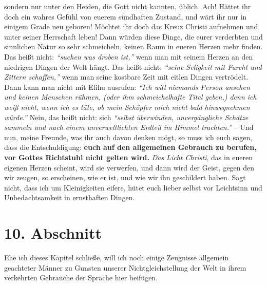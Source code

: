 sondern nur unter den Heiden, die
Gott nicht kannten, üblich. Ach! Hättet ihr doch ein wahres Gefühl von euerem
sündhaften Zustand, und wärt ihr nur in einigem
Grade neu geboren! Möchtet ihr
doch das Kreuz Christi aufnehmen und unter seiner
Herrschaft leben! Dann würden
diese Dinge, die eurer verderbten und sinnlichen
Natur so sehr schmeicheln,
keinen Raum in eueren Herzen mehr finden. Das heißt nicht:
\textit{"`suchen was droben ist,"'}
wenn man mit seinem Herzen an den niedrigen Dingen der Welt hängt. Das
heißt nicht:
\textit{"`seine Seligkeit mit Furcht und Zittern schaffen,"'} wenn man
seine kostbare Zeit mit eitlen Dingen vertrödelt. Dann kann man nicht mit
Elihu
ausrufen:
\textit{"`Ich will niemands Person ansehen und keinen Menschen rühmen, (oder
ihm schmeichelhafte Titel geben,) denn ich weiß nicht, wenn ich es täte, ob
mein Schöpfer mich nicht bald hinwegnehmen würde."'}
Nein, das heißt nicht: sich
\textit{"`selbst überwinden, unvergängliche
Schätze sammeln und nach einem
unverweltlichten Erdteil im Himmel trachten."'} -- Und nun, meine Freunde, was
ihr auch davon denken mögt, so muss ich euch sagen, dass die Entschuldigung:
\textbf{euch
auf den allgemeinen Gebrauch zu berufen, vor Gottes Richtstuhl nicht gelten
wird.} \textit{Das Licht Christi}, das in eueren eigenen Herzen
scheint, wird sie
verwerfen, und dann wird der Geist, gegen den wir zeugen, so erscheinen, wie er
ist, und wie wir ihn geschildert haben. Sagt nicht, dass ich um Kleinigkeiten
eifere, hütet euch lieber selbst vor Leichtsinn und Unbedachtsamkeit in
ernsthaften Dingen.

\section{10. Abschnitt} \label{kap10_ab10}

Ehe ich dieses Kapitel schließe, will ich noch einige Zeugnisse allgemein
geachteter Männer zu Gunsten unserer Nichtgleichstellung der Welt in ihrem
verkehrten Gebrauche der Sprache hier beifügen.

\medskip

